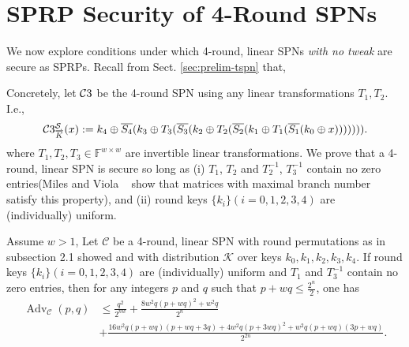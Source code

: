 

\section{SPRP Security of 4-Round SPNs}
\label{section:security of 4-round SPNs}

We now explore conditions under which 4-round, linear SPNs {\it with no tweak} are secure as SPRPs. Recall from Sect. \ref{sec:prelim-tspn} that,



Concretely, let $\mathcal{C}3$ be the 4-round SPN using any linear transformations $T_1,T_2$. I.e.,
%
$$\mathcal{C}3_{\overrightarrow{K}}^\mathcal{S}(x):=k_4\oplus\overline{S_4}(k_3\oplus T_3(\overline{S_3}(k_2\oplus T_2(\overline{S_2}(k_1\oplus T_1(\overline{S_1}(k_0\oplus x))))))).$$
%
where $T_{1}, T_{2}, T_{3} \in \mathbb{F}^{w \times w}$ are invertible linear transformations. We prove that a 4-round, linear SPN is secure so long as (i) $T_1$, $T_2$ and $T_{2}^{-1}$, $T_{3}^{-1}$ contain no zero entries(Miles and Viola ~\cite{miles2015substitution} show that matrices with maximal branch number ~\cite{daemen1995cipher} satisfy this property), and (ii) round keys $\{k_i\}(i=0, 1, 2, 3, 4)$ are (individually) uniform.


\begin{theorem}
\label{theorem:5-round-pub-pspn}
	
Assume $w>1$, Let $\mathcal{C}$ be a 4-round, linear SPN with round permutations as in subsection 2.1 showed and with distribution $\mathcal{K}$ over keys $k_{0}, k_{1}, k_{2}, k_{3}, k_{4}$. If round keys $\{k_i\}(i=0, 1, 2, 3, 4)$ are (individually) uniform and $T_1$ and $T_{3}^{-1}$ contain no zero entries, then for any integers $\mathit{p}$ and $\mathit{q}$ such that $p+wq \leq \frac{2^n}{2}$, one has
\begin{align}
\operatorname{Adv}_{\mathcal{C}}\left(p, q\right) &\leq \frac{q^2}{2^{n w}} + \frac{8 w^2 q(p+wq)^2+w^2 q}{2^n}\\
&+ \frac{16 w^2 q(p+w q)(p+w q +3 q)+4 w^2 q(p+3 wq)^2+ w^2q(p+w q)(3p+w q)}{2^{2 n}}.
\label{eq:bound-4-rounds}
\end{align}
\end{theorem}




